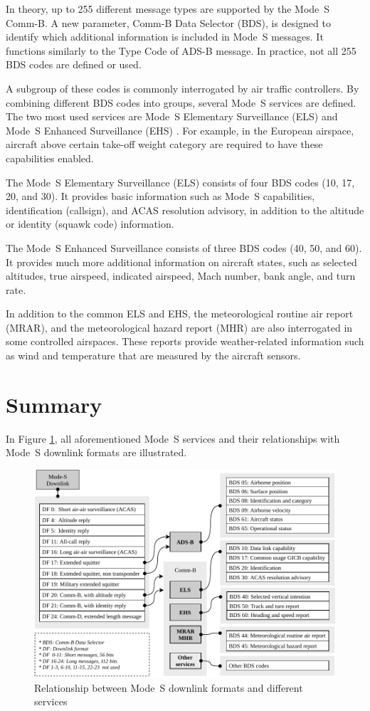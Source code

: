 In theory, up to 255 different message types are supported by the Mode~S Comm-B. A new parameter, Comm-B Data Selector (BDS), is designed to identify which additional information is included in Mode~S messages. It functions similarly to the Type Code of ADS-B message. In practice, not all 255 BDS codes are defined or used. 

A subgroup of these codes is commonly interrogated by air traffic controllers. By combining different BDS codes into groups, several Mode~S services are defined. The two most used services are Mode~S Elementary Surveillance (ELS) and Mode~S Enhanced Surveillance (EHS) \cite{grappel2008}. For example, in the European airspace, aircraft above certain take-off weight category are required to have these capabilities enabled.

The Mode~S Elementary Surveillance (ELS) consists of four BDS codes (10, 17, 20, and 30). It provides basic information such as Mode~S capabilities, identification (callsign), and ACAS resolution advisory, in addition to the altitude or identity (squawk code) information. 

The Mode~S Enhanced Surveillance consists of three BDS codes (40, 50, and 60). It provides much more additional information on aircraft states, such as selected altitudes, true airspeed, indicated airspeed, Mach number, bank angle, and turn rate.

In addition to the common ELS and EHS, the meteorological routine air report (MRAR), and the meteorological hazard report (MHR) are also interrogated in some controlled airspaces. These reports provide weather-related information such as wind and temperature that are measured by the aircraft sensors.


\section{Summary}

In Figure \ref{fig:mode_s_services}, all aforementioned Mode~S services and their relationships with Mode~S downlink formats are illustrated.

\begin{figure}[ht]
  \centering
  \includegraphics[width=\textwidth]{figures/intro/mode_s_services.pdf}
  \caption{Relationship between Mode~S downlink formats and different services}
  \label{fig:mode_s_services}
\end{figure}

